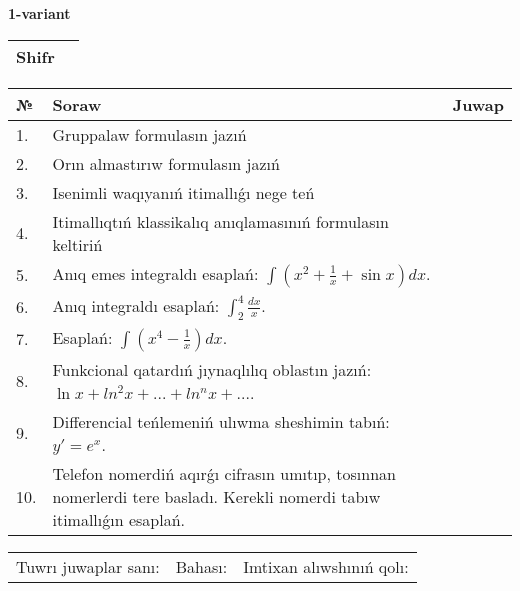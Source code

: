 \documentclass{article}
\begin{document}


  \textbf{1-variant}\\
  
  \bgroup
  \def\arraystretch{1.6} %
  
  \begin{tabular}{|m{5.7cm}|m{9.5cm}|}
  \hline
  Shifr & \\
  \hline
  \end{tabular}
  
  \vspace{1cm}
  
  \begin{tabular}{|m{0.7cm}|m{10cm}|m{4cm}|}
  \hline
  № & Soraw & Juwap \\
  \hline
  1. & Gruppalaw formulasın jazıń &  \\
  \hline
  2. & Orın almastırıw formulasın jazıń &  \\
  \hline
  3. & Isenimli waqıyanıń itimallıǵı nege teń &  \\
  \hline
  4. & Itimallıqtıń klassikalıq anıqlamasınıń formulasın keltiriń &  \\
  \hline
  5. & Anıq emes integraldı esaplań: \(\int{\left( x^2  + \frac{1}{x} + \sin x \right)dx}\). &  \\
  \hline
  6. & Anıq integraldı esaplań: \(\int_{2}^{4}\frac{dx}{x}\). &  \\
  \hline
  7. & Esaplań: \(\int\left( x^{4} - \frac{1}{x} \right)dx\). &  \\
  \hline
  8. & Funkcional qatardıń jıynaqlılıq oblastın jazıń: \(\ln x + ln^2 x + ... + ln^{n}x + ...\). &  \\
  \hline
  9. & Differencial teńlemeniń ulıwma sheshimin tabıń: \(y' = e^{x}\). &  \\
  \hline
  10. & Telefon nomerdiń aqırǵı cifrasın umıtıp, tosınnan nomerlerdi tere basladı. Kerekli nomerdi tabıw itimallıǵın esaplań. &  \\
  \hline
  \end{tabular}
  
  \vspace{1cm}
  
  \begin{tabular}{lll}
  Tuwrı juwaplar sanı: \underline{\hspace{1.5cm}} & 
  Bahası: \underline{\hspace{1.5cm}} & 
  Imtixan alıwshınıń qolı: \underline{\hspace{2cm}} \\
  \end{tabular}
  
\end{document}

